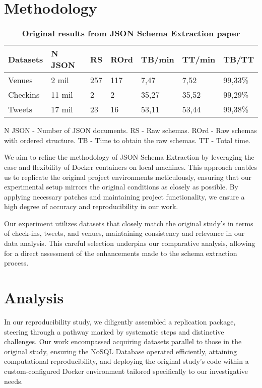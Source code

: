 \documentclass[sigconf, nonacm]{acmart}
\begin{document}
\section{\textbf{Methodology }  }



\begin{table}[ht]
\centering
\begin{tabular}{| l | l | l | l | l | l | l |}
\toprule
Datasets& N JSON& RS& ROrd& TB/min& TT/min& TB/TT\\ \midrule
Venues& 2 mil& 257& 117& 7,47 & 7,52 & 99,33\%\\
Checkins& 11 mil& 2& 2& 35,27 & 35,52& 99,29\%\\
Tweets&  17 mil& 23& 16& 53,11 & 53,44 & 99,38\%\\
\bottomrule
\end{tabular}
\caption{\textbf{ Original results from JSON Schema Extraction paper} }

N JSON - Number of JSON documents. RS - Raw schemas. ROrd - Raw schemas with ordered structure. TB - Time to obtain the raw schemas. TT - Total time.


\label{your-table-label}
\end{table}

We aim to refine the methodology of JSON Schema Extraction by leveraging the ease and flexibility of Docker containers on local machines. This approach enables us to replicate the original project environments meticulously, ensuring that our experimental setup mirrors the original conditions as closely as possible. By applying necessary patches and maintaining project functionality, we ensure a high degree of accuracy and reproducibility in our work.

Our experiment utilizes datasets that closely match the original study's in terms of check-ins, tweets, and venues, maintaining consistency and relevance in our data analysis. This careful selection underpins our comparative analysis, allowing for a direct assessment of the enhancements made to the schema extraction process.




\section{\textbf{Analysis  }}

In our reproducibility study, we diligently assembled a replication package, steering through a pathway marked by systematic steps and distinctive challenges. Our work encompassed acquiring datasets parallel to those in the original study, ensuring the NoSQL Database operated efficiently, attaining computational reproducibility, and deploying the original study's code within a custom-configured Docker environment tailored specifically to our investigative needs.
\end{document}
